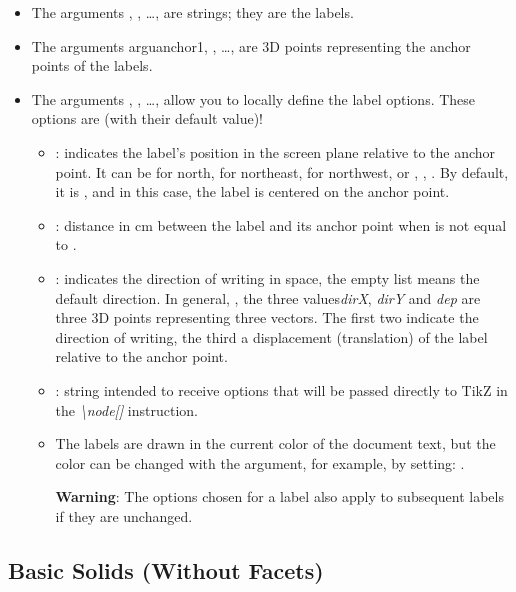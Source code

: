 \begin{itemize}
    \item The arguments , , \ldots, are strings; they are the labels.

    \item The arguments argu{anchor1}, , \ldots, are 3D points representing the anchor points of the labels.

     \item The arguments , , \ldots, allow you to locally define the label options. These options are (with their default value)!

\begin{itemize}
    \item {}: indicates the label's position in the screen plane relative to the anchor point. It can be  for north,  for northeast,  for northwest, or , , . By default, it is , and in this case, the label is centered on the anchor point.

     \item {}: distance in cm between the label and its anchor point when  is not equal to .

    \item {}: indicates the direction of writing in space, the empty list means the default direction. In general, , the three values ​​\emph{dirX}, \emph{dirY} and \emph{dep} are three 3D points representing three vectors. The first two indicate the direction of writing, the third a displacement (translation) of the label relative to the anchor point.

    \item {}: string intended to receive options that will be passed directly to TikZ in the \emph{\textbackslash node[]} instruction.

    \item The labels are drawn in the current color of the document text, but the color can be changed with the  argument, for example, by setting: .

\textbf{Warning}: The options chosen for a label also apply to subsequent labels if they are unchanged.
\end{itemize}
\end{itemize}

\subsection{Basic Solids (Without Facets)}

